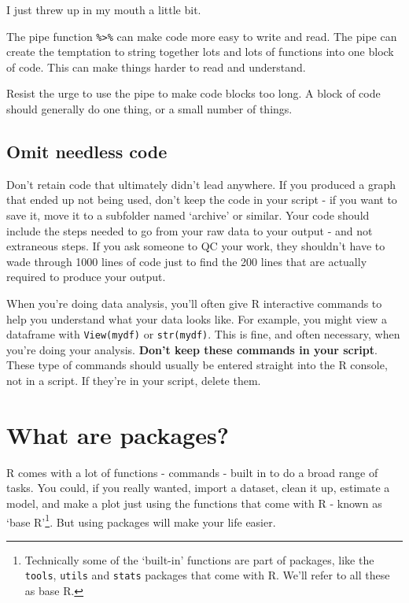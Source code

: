 \documentclass[
]{book}
\begin{document}
I just threw up in my mouth a little bit.

The pipe function \texttt{\%\textgreater{}\%} can make code more easy to write and read. The pipe can create the temptation to string together lots and lots of functions into one block of code. This can make things harder to read and understand.

Resist the urge to use the pipe to make code blocks too long. A block of code should generally do one thing, or a small number of things.

\hypertarget{omit-needless-code}{%
\section{Omit needless code}\label{omit-needless-code}}

Don't retain code that ultimately didn't lead anywhere. If you produced a graph that ended up not being used, don't keep the code in your script - if you want to save it, move it to a subfolder named `archive' or similar. Your code should include the steps needed to go from your raw data to your output - and not extraneous steps. If you ask someone to QC your work, they shouldn't have to wade through 1000 lines of code just to find the 200 lines that are actually required to produce your output.

When you're doing data analysis, you'll often give R interactive commands to help you understand what your data looks like. For example, you might view a dataframe with \texttt{View(mydf)} or \texttt{str(mydf)}. This is fine, and often necessary, when you're doing your analysis. \textbf{Don't keep these commands in your script}. These type of commands should usually be entered straight into the R console, not in a script. If they're in your script, delete them.

\hypertarget{packages}{%
\chapter{What are packages?}\label{packages}}

R comes with a lot of functions - commands - built in to do a broad range of tasks. You could, if you really wanted, import a dataset, clean it up, estimate a model, and make a plot just using the functions that come with R - known as `base R'\footnote{Technically some of the `built-in' functions are part of packages, like the \texttt{tools}, \texttt{utils} and \texttt{stats} packages that come with R. We'll refer to all these as base R.}. But using packages will make your life easier.
\end{document}
